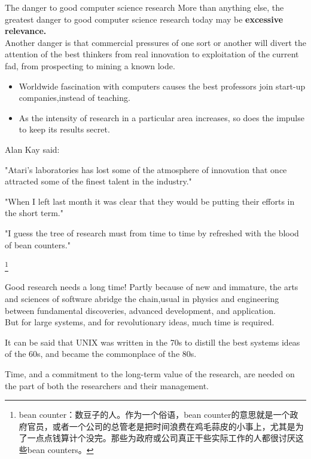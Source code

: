 \documentclass[CJK]{beamer}
\begin{document}
\begin{CJK*}{UTF8}{gbsn}
\begin{frame}{The danger to good computer science research}
More than anything else, the greatest danger to good computer science research today may be {\bf excessive relevance.}\\
Another danger is that commercial pressures of one sort or another will divert the attention of the best thinkers from real innovation to exploitation of the current fad, from prospecting to mining a known lode.
\begin{itemize}
	\item Worldwide fascination with computers causes the best professors join start-up companies,instead of teaching.
	\item As the intensity of research in a particular area increases, so does the impulse to keep its results secret.
\end{itemize} 
\end{frame}

\begin{frame}{Alan Kay said:}
\begin{block}{}
"Atari's laboratories has lost some of the atmosphere of innovation that once attracted some of the finest talent in the industry."
\end{block}	
\begin{block}{}
"When I left last month it was clear that they would be putting their efforts in the short term."
\end{block}
\begin{block}{}
"I guess the tree of research must from time to time by refreshed with the blood of bean counters."
\end{block}
\footnote{\tiny {bean counter：数豆子的人。作为一个俗语，bean counter的意思就是一个政府官员，或者一个公司的总管老是把时间浪费在鸡毛蒜皮的小事上，尤其是为了一点点钱算计个没完。那些为政府或公司真正干些实际工作的人都很讨厌这些bean counters。}}
\end{frame}

\begin{frame}{Good research needs a long time!}
Partly because of new and immature, the arts and sciences of software abridge the chain,usual in physics and engineering between fundamental discoveries, advanced development, and application.\\
But for large systems, and for revolutionary ideas, much time is required.
\begin{block}{}
It can be said that UNIX was written in the 70s to distill the best systems ideas of the 60s, and became the commonplace of the 80s.
\end{block}
\begin{block}{}
Time, and a commitment to the long-term value of the research, are needed on the part of both the researchers and their management.
\end{block}
\end{frame}


\end{CJK*}
\end{document}

